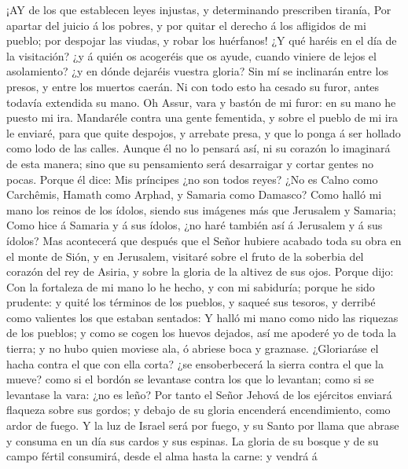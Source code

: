  ¡AY de los que establecen leyes injustas, y determinando
prescriben tiranía,  Por apartar del juicio á los pobres, y
por quitar el derecho á los afligidos de mi pueblo; por despojar las
viudas, y robar los huérfanos!  ¿Y qué haréis en el día de
la visitación? ¿y á quién os acogeréis que os ayude, cuando viniere de
lejos el asolamiento? ¿y en dónde dejaréis vuestra gloria? 
Sin mí se inclinarán entre los presos, y entre los muertos caerán. Ni
con todo esto ha cesado su furor, antes todavía extendida su mano.
 Oh Assur, vara y bastón de mi furor: en su mano he puesto
mi ira.  Mandaréle contra una gente fementida, y sobre el
pueblo de mi ira le enviaré, para que quite despojos, y arrebate presa,
y que lo ponga á ser hollado como lodo de las calles. 
Aunque él no lo pensará así, ni su corazón lo imaginará de esta manera;
sino que su pensamiento será desarraigar y cortar gentes no pocas.
 Porque él dice: Mis príncipes ¿no son todos reyes?
 ¿No es Calno como Carchêmis, Hamath como Arphad, y Samaria
como Damasco?  Como halló mi mano los reinos de los ídolos,
siendo sus imágenes más que Jerusalem y Samaria;  Como hice
á Samaria y á sus ídolos, ¿no haré también así á Jerusalem y á sus
ídolos?  Mas acontecerá que después que el Señor hubiere
acabado toda su obra en el monte de Sión, y en Jerusalem, visitaré sobre
el fruto de la soberbia del corazón del rey de Asiria, y sobre la gloria
de la altivez de sus ojos.  Porque dijo: Con la fortaleza
de mi mano lo he hecho, y con mi sabiduría; porque he sido prudente: y
quité los términos de los pueblos, y saqueé sus tesoros, y derribé como
valientes los que estaban sentados:  Y halló mi mano como
nido las riquezas de los pueblos; y como se cogen los huevos dejados,
así me apoderé yo de toda la tierra; y no hubo quien moviese ala, ó
abriese boca y graznase.  ¿Gloriaráse el hacha contra el
que con ella corta? ¿se ensoberbecerá la sierra contra el que la mueve?
como si el bordón se levantase contra los que lo levantan; como si se
levantase la vara: ¿no es leño?  Por tanto el Señor Jehová
de los ejércitos enviará flaqueza sobre sus gordos; y debajo de su
gloria encenderá encendimiento, como ardor de fuego.  Y la
luz de Israel será por fuego, y su Santo por llama que abrase y consuma
en un día sus cardos y sus espinas.  La gloria de su bosque
y de su campo fértil consumirá, desde el alma hasta la carne: y vendrá á
